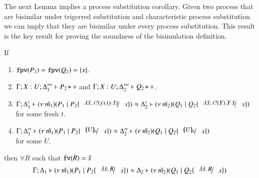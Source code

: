
The next Lemma implies a process substitution corollary.
Given two process that are bisimilar under trigerred substitution
and characteristic process substitution we can imply that they are
bisimilar under every process substitution. This result is
the key result for proving the soundness of the bisimulation
definition.

\begin{lemma}\rm
	\label{lem:subst_equiv}
	If 
%
	\begin{enumerate}
		\item	$\mathtt{fpv}(P_2) = \mathtt{fpv}(Q_2) = \{x\}$.
		\item	$\Gamma; X: U; \Delta_1''' \vdash P_2 \triangleright \diamond$ and $\Gamma; X: U; \Delta_2''' \vdash Q_2 \triangleright \diamond$.
		\item	$\horel{\Gamma}{\Delta_1'}{\newsp{\tilde{m_1}}{P_1 \Par P_2 \subst{\abs{\tilde{x}}{\binp{t}{y} (\appl{y}{\tilde{x}})}}{x}}}
			{\wb}
			{\Delta_2'}{\newsp{\tilde{m_2}}{Q_1 \Par Q_2 \subst{\abs{\tilde{x}}{\binp{t}{Y} \appl{Y}{\tilde{x}}}}{x}}}$ \\
			for some fresh $t$.

		\item	$\horel{\Gamma}{\Delta_1''}{\newsp{\tilde{m_1}}{P_1 \Par P_2 \subst{\omapchar{U}}{x}}}
			{\wb}{\Delta_2''}{\newsp{\tilde{m_2}}{Q_1 \Par Q_2 \subst{\omapchar{U}}{x}}}$\\
			for some $U$.
	\end{enumerate}
%
	then $\forall R$ such that $\mathtt{fv}(R) = \tilde{x}$
\[
	\horel{\Gamma}{\Delta_1}{\newsp{\tilde{m_1}}{P_1 \Par P_2 \subst{\abs{\tilde{x}}{R}}{x}}}
	{\wb}
	{\Delta_2}{\newsp{\tilde{m_2}}{Q_1 \Par Q_2 \subst{\abs{\tilde{x}}{R}}{x}}}
\]
\end{lemma}

